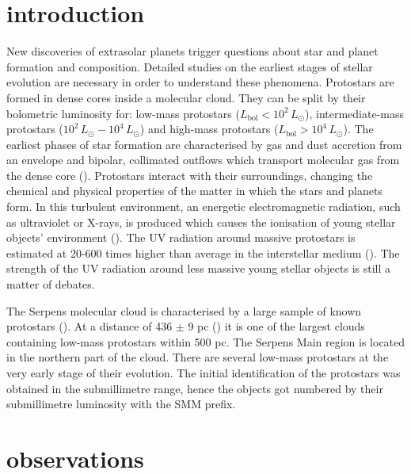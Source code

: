 \documentclass[a4paper]{article}
\begin{document}
\section*{\sc introduction}
\indent \indent New discoveries of extrasolar planets trigger questions about star and planet formation and composition. Detailed studies on the earliest stages of stellar evolution are necessary in order to understand these phenomena. Protostars are formed in dense cores inside a molecular cloud. They can be split by their bolometric luminosity for: low-mass protostars ($L_{\mathrm{bol}} < 10^2 \, L{_\odot}$), intermediate-mass protostars ($10^2 \, L{_\odot} - 10^4 \, L{_\odot}$) and high-mass protostars ($L_{\mathrm{bol}} > 10^4 \, L{_\odot}$). The earliest phases of star formation are characterised by gas and dust accretion from an envelope and bipolar, collimated outflows which transport molecular gas from the dense core (\cite{arce2006}). Protostars interact with their surroundings, changing the chemical and physical properties of the matter in which the stars and planets form. In this turbulent environment, an energetic electromagnetic radiation, such as ultraviolet or X-rays, is produced which causes the ionisation of young stellar objects' environment (\cite{stauber2007}). The UV radiation around massive protostars is estimated at 20-600 times higher than average in the interstellar medium (\cite{benz2016}). The strength of the UV radiation around less massive young stellar objects is still a matter of debates. 

\indent \indent The Serpens molecular cloud is characterised by a large sample of known protostars (\cite{evans2009}). At a distance of 436 $\pm$ 9 pc (\cite{ortiz2017}) it is one of the largest clouds containing low-mass protostars within 500 pc. The Serpens Main region is located in the northern part of the cloud. There are several low-mass protostars at the very early stage of their evolution. The initial identification of the protostars was obtained in the submillimetre range, hence the objects got numbered by their submillimetre luminosity with the SMM prefix. 

\section*{\sc observations}
\end{document}
